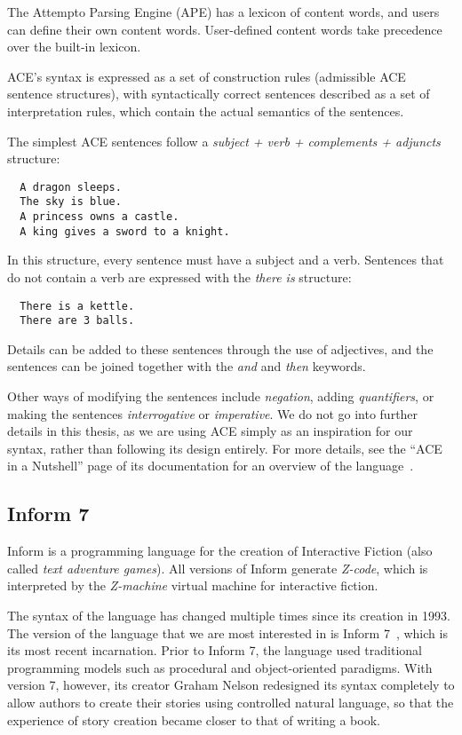 The Attempto Parsing Engine (APE) has a lexicon of content words, and users can
define their own content words. User-defined content words take precedence over
the built-in lexicon.

ACE's syntax is expressed as a set of construction rules (admissible ACE
sentence structures), with syntactically
correct sentences described as a set of interpretation rules, which contain the
actual semantics of the sentences.

The simplest ACE sentences follow a \emph{subject + verb + complements +
  adjuncts} structure:

\begin{lstlisting}
  A dragon sleeps.
  The sky is blue.
  A princess owns a castle.
  A king gives a sword to a knight.
\end{lstlisting}

In this structure, every sentence must have a subject and a verb. Sentences that
do not contain a verb are expressed with the \emph{there is} structure:

\begin{lstlisting}
  There is a kettle.
  There are 3 balls.
\end{lstlisting}

Details can be added to these sentences through the use of adjectives, and the
sentences can be joined together with the \emph{and} and \emph{then} keywords.

Other ways of modifying the sentences include \emph{negation}, adding
\emph{quantifiers}, or making the sentences \emph{interrogative} or
\emph{imperative}. We do not go into further details in this thesis, as we are
using ACE simply as an inspiration for our syntax, rather than following its
design entirely. For more details, see the ``ACE in a Nutshell'' page of its
documentation for an overview of the language~\cite{ace-nutshell}.

\subsection{Inform 7}

Inform is a programming language for the creation of Interactive Fiction (also
called \emph{text adventure games}). All versions of Inform generate
\emph{Z-code}, which is interpreted by the \emph{Z-machine} virtual machine for
interactive fiction.

The syntax of the language has changed multiple times since its creation in
1993. The version of the language that we are most interested in is Inform 7~\cite{reed2010creating},
which is its most recent incarnation. Prior to Inform 7, the language used
traditional programming models such as procedural and object-oriented paradigms.
With version 7, however, its creator Graham Nelson redesigned its
syntax completely to allow authors to create their stories using controlled
natural language, so that the experience of story creation became closer to that
of writing a book.

